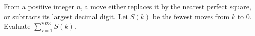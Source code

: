 From a positive integer $n$, a move either replaces it by the nearest perfect square, or subtracts its largest decimal digit. Let $S(k)$ be the fewest moves from $k$ to $0$. Evaluate $\sum_{k=1}^{2023}S(k)$.
